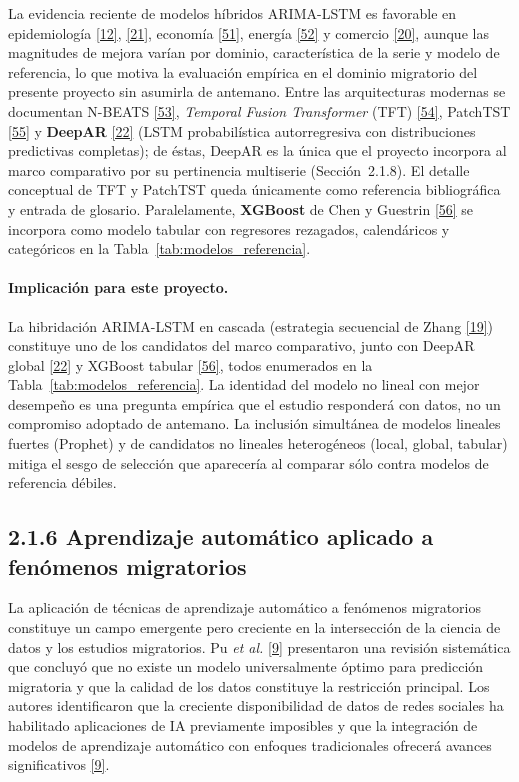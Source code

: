 \documentclass[12pt,letterpaper]{report}
\newcommand{\cita}[1]{\hyperref[bib:#1]{[#1]}}
\begin{document}
La evidencia reciente de modelos híbridos ARIMA-LSTM es favorable en epidemiología \cita{12}, \cita{21}, economía \cita{51}, energía \cita{52} y comercio \cita{20}, aunque las magnitudes de mejora varían por dominio, característica de la serie y modelo de referencia, lo que motiva la evaluación empírica en el dominio migratorio del presente proyecto sin asumirla de antemano. Entre las arquitecturas modernas se documentan N-BEATS \cita{53}, \textit{Temporal Fusion Transformer} (TFT) \cita{54}, PatchTST \cita{55} y \textbf{DeepAR} \cita{22} (LSTM probabilística autorregresiva con distribuciones predictivas completas); de éstas, DeepAR es la única que el proyecto incorpora al marco comparativo por su pertinencia multiserie (Sección~2.1.8). El detalle conceptual de TFT y PatchTST queda únicamente como referencia bibliográfica y entrada de glosario. Paralelamente, \textbf{XGBoost} de Chen y Guestrin \cita{56} se incorpora como modelo tabular con regresores rezagados, calendáricos y categóricos en la Tabla~\ref{tab:modelos_referencia}.

\paragraph{Implicación para este proyecto.} La hibridación ARIMA-LSTM en cascada (estrategia secuencial de Zhang \cita{19}) constituye uno de los candidatos del marco comparativo, junto con DeepAR global \cita{22} y XGBoost tabular \cita{56}, todos enumerados en la Tabla~\ref{tab:modelos_referencia}. La identidad del modelo no lineal con mejor desempeño es una pregunta empírica que el estudio responderá con datos, no un compromiso adoptado de antemano. La inclusión simultánea de modelos lineales fuertes (Prophet) y de candidatos no lineales heterogéneos (local, global, tabular) mitiga el sesgo de selección que aparecería al comparar sólo contra modelos de referencia débiles.

\subsection{2.1.6 Aprendizaje automático aplicado a fenómenos migratorios}

La aplicación de técnicas de aprendizaje automático a fenómenos migratorios constituye un campo emergente pero creciente en la intersección de la ciencia de datos y los estudios migratorios. Pu \textit{et al.} \cita{9} presentaron una revisión sistemática que concluyó que no existe un modelo universalmente óptimo para predicción migratoria y que la calidad de los datos constituye la restricción principal. Los autores identificaron que la creciente disponibilidad de datos de redes sociales ha habilitado aplicaciones de IA previamente imposibles y que la integración de modelos de aprendizaje automático con enfoques tradicionales ofrecerá avances significativos \cita{9}.
\end{document}
